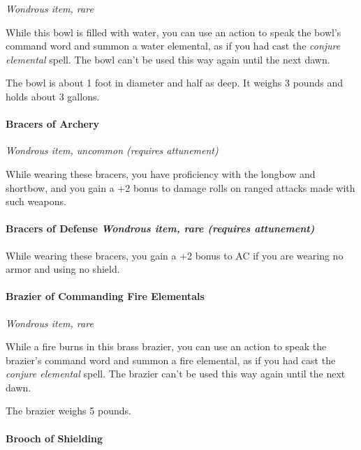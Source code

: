 \documentclass[
]{article}
\begin{document}
\emph{Wondrous item, rare}

While this bowl is filled with water, you can use an action to speak the
bowl's command word and summon a water elemental, as if you had cast the
\emph{conjure elemental} spell. The bowl can't be used this way again
until the next dawn.

The bowl is about 1 foot in diameter and half as deep. It weighs 3
pounds and holds about 3 gallons.

\hypertarget{bracers-of-archery}{%
\paragraph{Bracers of Archery}\label{bracers-of-archery}}

\emph{Wondrous item, uncommon (requires attunement)}

While wearing these bracers, you have proficiency with the longbow and
shortbow, and you gain a +2 bonus to damage rolls on ranged attacks made
with such weapons.

\hypertarget{bracers-of-defense-wondrous-item-rare-requires-attunement}{%
\paragraph{\texorpdfstring{Bracers of Defense \emph{Wondrous item, rare
(requires
attunement)}}{Bracers of Defense Wondrous item, rare (requires attunement)}}\label{bracers-of-defense-wondrous-item-rare-requires-attunement}}

While wearing these bracers, you gain a +2 bonus to AC if you are
wearing no armor and using no shield.

\hypertarget{brazier-of-commanding-fire-elementals}{%
\paragraph{Brazier of Commanding Fire
Elementals}\label{brazier-of-commanding-fire-elementals}}

\emph{Wondrous item, rare}

While a fire burns in this brass brazier, you can use an action to speak
the brazier's command word and summon a fire elemental, as if you had
cast the \emph{conjure elemental} spell. The brazier can't be used this
way again until the next dawn.

The brazier weighs 5 pounds.

\hypertarget{brooch-of-shielding}{%
\paragraph{Brooch of Shielding}\label{brooch-of-shielding}}
\end{document}
